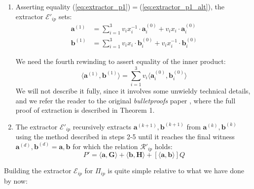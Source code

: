 \documentclass[../../book.tex]{subfiles}
\begin{document}
\begin{enumerate}
\begin{equation}
            \label{eq:extractor_p1_alt}
        \end{equation}
    \item Asserting equality (\ref{eq:extractor_p1})$=$(\ref{eq:extractor_p1_alt}), the extractor $\mathcal{E}'_{ip}$ sets:
        \begin{align}
            \mathbf{a}^{(1)} &= \sum_{i=1}^3 v_i x_i^{-1} \cdot \mathbf{a}_i^{(0)} + v_i x_i \cdot \mathbf{a}_i^{(0)} \\
            \mathbf{b}^{(1)} &= \sum_{i=1}^3 v_i x_i \cdot \mathbf{b}_i^{(0)} + v_i x_i^{-1} \cdot \mathbf{b}_i^{(0)}
        \end{align}    
    
        We need the fourth rewinding to assert equality of the inner product:
        $$\langle \mathbf{a}^{(1)}, \mathbf{b}^{(1)} \rangle = \sum_{i=1}^3 v_i \langle \mathbf{a}_i^{(0)}, \mathbf{b}_i^{(0)} \rangle$$
        We will not describe it fully, since it involves some unwieldy technical details, and we refer the reader to the original \textit{bulletproofs} paper \cite{bulletproofs}, where the full proof of extraction is described in Theorem 1.
    \item The extractor $\mathcal{E}'_{ip}$ recursively extracts $\mathbf{a}^{(k+1)}, \mathbf{b}^{(k+1)}$ from $ \mathbf{a}^{(k)}, \mathbf{b}^{(k)}$ using the method described in steps 2-5 until it reaches the final witness $\mathbf{a}^{(d)}, \mathbf{b}^{(d)} = \mathbf{a}, \mathbf{b}$ for which the relation $\mathcal{R}'_{ip}$ holds: 
    $$P' =  \langle \mathbf{a,G} \rangle + \langle \mathbf{b,H} \rangle + [\langle \mathbf{a,b} \rangle]Q$$
\end{enumerate}
Building the extractor $\mathcal{E}_{ip}$ for $\Pi_{ip}$ is quite simple relative to what we have done by now:
\end{document}
